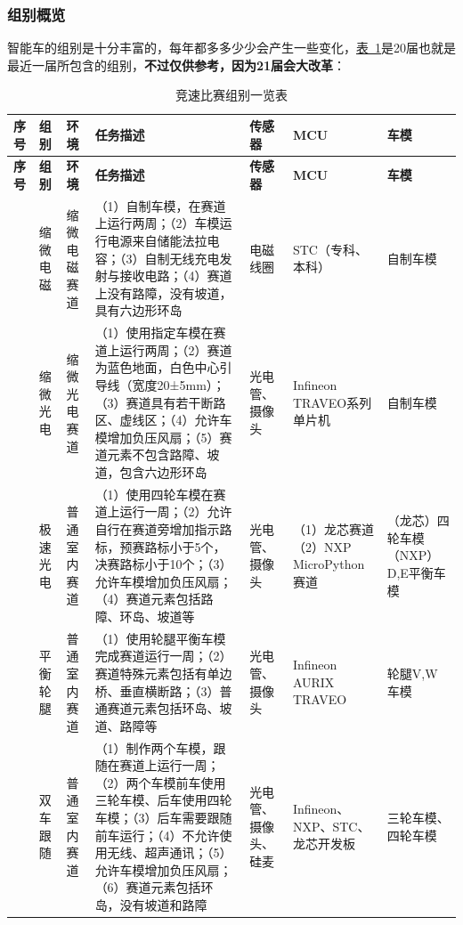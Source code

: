 \documentclass[a4paper,12pt]{article}
\begin{document}
\subsubsection{组别概览}
\label{sec:categories}

智能车的组别是十分丰富的，每年都多多少少会产生一些变化，\hyperref[tab:race-categories]{表~\ref*{tab:race-categories}}是20届也就是最近一届所包含的组别，\textbf{不过仅供参考，因为21届会大改革}：

{\tiny
\begin{longtable}{|>{\centering\arraybackslash}m{0.8cm}|>{\centering\arraybackslash}m{1.5cm}|>{\centering\arraybackslash}m{1.5cm}|>{\centering\arraybackslash}m{5.5cm}|>{\centering\arraybackslash}m{1.8cm}|>{\centering\arraybackslash}m{2cm}|>{\centering\arraybackslash}m{1.5cm}|}
\caption{竞速比赛组别一览表} \label{tab:race-categories} \\
\hline
\textbf{序号} & \textbf{组别} & \textbf{环境} & \textbf{任务描述} & \textbf{传感器} & \textbf{MCU} & \textbf{车模} \\
\hline
\endfirsthead
\hline
\textbf{序号} & \textbf{组别} & \textbf{环境} & \textbf{任务描述} & \textbf{传感器} & \textbf{MCU} & \textbf{车模} \\
\hline
\endhead
\hline
\endfoot
1 & 缩微电磁 & 缩微电磁赛道 & （1）自制车模，在赛道上运行两周；（2）车模运行电源来自储能法拉电容；（3）自制无线充电发射与接收电路；（4）赛道上没有路障，没有坡道，具有六边形环岛 & 电磁线圈 & STC（专科、本科） & 自制车模 \\
\hline
2 & 缩微光电 & 缩微光电赛道 & （1）使用指定车模在赛道上运行两周；（2）赛道为蓝色地面，白色中心引导线（宽度20±5mm）；（3）赛道具有若干断路区、虚线区；（4）允许车模增加负压风扇；（5）赛道元素不包含路障、坡道，包含六边形环岛 & 光电管、摄像头 & Infineon TRAVEO系列单片机 & 自制车模 \\
\hline
3 & 极速光电 & 普通室内赛道 & （1）使用四轮车模在赛道上运行一周；（2）允许自行在赛道旁增加指示路标，预赛路标小于5个，决赛路标小于10个；（3）允许车模增加负压风扇；（4）赛道元素包括路障、环岛、坡道等 & 光电管、摄像头 & （1）龙芯赛道（2）NXP MicroPython赛道 & （龙芯）四轮车模（NXP）D,E平衡车模 \\
\hline
4 & 平衡轮腿 & 普通室内赛道 & （1）使用轮腿平衡车模完成赛道运行一周；（2）赛道特殊元素包括有单边桥、垂直横断路；（3）普通赛道元素包括环岛、坡道、路障等 & 光电管、摄像头 & Infineon AURIX TRAVEO & 轮腿V,W车模 \\
\hline
5 & 双车跟随 & 普通室内赛道 & （1）制作两个车模，跟随在赛道上运行一周；（2）两个车模前车使用三轮车模、后车使用四轮车模；（3）后车需要跟随前车运行；（4）不允许使用无线、超声通讯；（5）允许车模增加负压风扇；（6）赛道元素包括环岛，没有坡道和路障 & 光电管、摄像头、硅麦 & Infineon、NXP、STC、龙芯开发板 & 三轮车模、四轮车模 \\

\end{longtable}}
\end{document}
